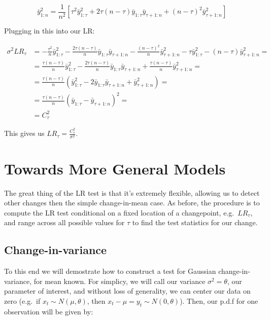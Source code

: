 \documentclass[
  letterpaper,
  DIV=11,
  numbers=noendperiod]{scrreprt}
\begin{document}
\[
\bar{y}_{1:n}^2 = \frac{1}{n^2}  \left[ \tau^2 \bar{y}_{1:\tau}^2 + 2 \tau (n - \tau) \bar{y}_{1:\tau}\bar{y}_{\tau+1:n} + (n - \tau)^2 \bar{y}_{\tau+1:n}^2 \right]
\]

Plugging in this into our LR:

\[
\begin{align}
\sigma^2 LR_\tau &= - \frac{\tau^2}{n} \bar{y}_{1:\tau}^2 - \frac{2 \tau (n - \tau)}{n} \bar{y}_{1:\tau}\bar{y}_{\tau+1:n}  - \frac{(n - \tau)^2}{n} \bar{y}_{\tau+1:n}^2 - \tau \bar{y}_{1:\tau}^2 - (n - \tau) \bar{y}_{\tau+1:n}^2=\\
&=  \frac{\tau (n - \tau)}{n} \bar{y}_{1:\tau}^2 -  \frac{2 \tau (n - \tau)}{n} \bar{y}_{1:\tau}\bar{y}_{\tau+1:n} + \frac{\tau (n - \tau)}{n}  \bar{y}_{\tau+1:n}^2 = \\  
&= \frac{\tau (n - \tau)}{n} (\bar{y}_{1:\tau}^2  - 2 \bar{y}_{1:\tau}\bar{y}_{\tau+1:n} + \bar{y}_{\tau+1:n}^2)=\\
&= \frac{\tau (n - \tau)}{n} (\bar{y}_{1:\tau} - \bar{y}_{\tau+1:n})^2=\\
&= C_\tau^2
\end{align}
\]

This gives us \(LR_\tau = \frac{C_\tau^2}{\sigma^2}\).

\section{Towards More General Models}\label{towards-more-general-models}

The great thing of the LR test is that it's extremely flexible, allowing
us to detect other changes then the simple change-in-mean case. As
before, the procedure is to compute the LR test conditional on a fixed
location of a changepoint, e.g.~\(LR_\tau\), and range across all
possible values for \(\tau\) to find the test statistics for our change.

\subsection{Change-in-variance}\label{change-in-variance}

To this end we will demostrate how to construct a test for Gaussian
change-in-variance, for mean known. For simplicy, we will call our
variance \(\sigma^2 = \theta\), our parameter of interest, and without
loss of generality, we can center our data on zero (e.g.~if
\(x_t \sim N(\mu, \theta)\), then
\(x_t - \mu = y_t \sim N(0, \theta)\)). Then, our p.d.f for one
observation will be given by:
\end{document}
